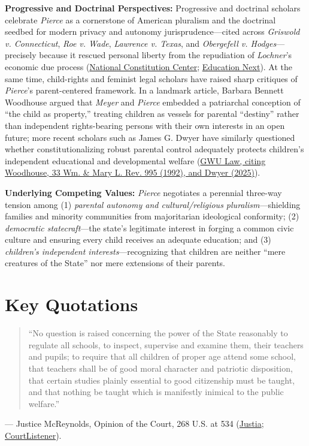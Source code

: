 \documentclass[12pt]{article}
\begin{document}
\textbf{Progressive and Doctrinal Perspectives:} Progressive and doctrinal scholars celebrate \textit{Pierce} as a cornerstone of American pluralism and the doctrinal seedbed for modern privacy and autonomy jurisprudence---cited across \textit{Griswold v. Connecticut}, \textit{Roe v. Wade}, \textit{Lawrence v. Texas}, and \textit{Obergefell v. Hodges}---precisely because it rescued personal liberty from the repudiation of \textit{Lochner}'s economic due process (\href{https://constitutioncenter.org/the-constitution/supreme-court-case-library/pierce-v-society-of-sisters}{National Constitution Center}; \href{https://www.educationnext.org/centennial-of-pierce-v-society-of-sisters-landmark-decision-school-choice/}{Education Next}). At the same time, child-rights and feminist legal scholars have raised sharp critiques of \textit{Pierce}'s parent-centered framework. In a landmark article, Barbara Bennett Woodhouse argued that \textit{Meyer} and \textit{Pierce} embedded a patriarchal conception of ``the child as property,'' treating children as vessels for parental ``destiny'' rather than independent rights-bearing persons with their own interests in an open future; more recent scholars such as James G. Dwyer have similarly questioned whether constitutionalizing robust parental control adequately protects children's independent educational and developmental welfare (\href{https://scholarship.law.gwu.edu/cgi/viewcontent.cgi?params=/context/faculty_publications/article/2970/&path_info=202401_Text.pdf}{GWU Law, citing Woodhouse, 33 Wm. \& Mary L. Rev. 995 (1992), and Dwyer (2025)}).

\textbf{Underlying Competing Values:} \textit{Pierce} negotiates a perennial three-way tension among (1) \textit{parental autonomy and cultural/religious pluralism}---shielding families and minority communities from majoritarian ideological conformity; (2) \textit{democratic statecraft}---the state's legitimate interest in forging a common civic culture and ensuring every child receives an adequate education; and (3) \textit{children's independent interests}---recognizing that children are neither ``mere creatures of the State'' nor mere extensions of their parents.

\section{Key Quotations}
\begin{quote}
``No question is raised concerning the power of the State reasonably to regulate all schools, to inspect, supervise and examine them, their teachers and pupils; to require that all children of proper age attend some school, that teachers shall be of good moral character and patriotic disposition, that certain studies plainly essential to good citizenship must be taught, and that nothing be taught which is manifestly inimical to the public welfare.''
\end{quote}
\noindent --- Justice McReynolds, Opinion of the Court, 268 U.S. at 534 (\href{https://supreme.justia.com/cases/federal/us/268/510/}{Justia}; \href{https://www.courtlistener.com/opinion/100694/pierce-v-society-of-sisters/}{CourtListener}).
\end{document}
